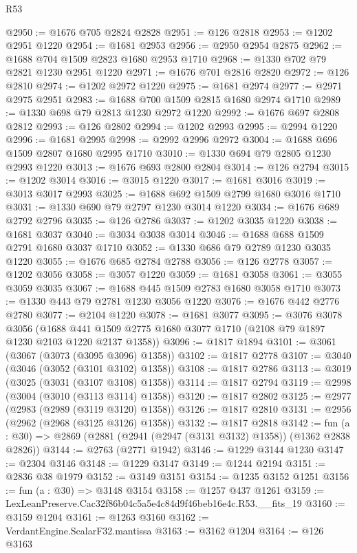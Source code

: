 \begin{lexlean}{R53}
\begin{coremodule}
@2950 := @1676 @705 @2824 @2828
@2951 := @126 @2818
@2953 := @1202 @2951 @1220
@2954 := @1681 @2953
@2956 := @2950 @2954 @2875
@2962 := @1688 @704 @1509 @2823 @1680 @2953 @1710
@2968 := @1330 @702 @79 @2821 @1230 @2951 @1220
@2971 := @1676 @701 @2816 @2820
@2972 := @126 @2810
@2974 := @1202 @2972 @1220
@2975 := @1681 @2974
@2977 := @2971 @2975 @2951
@2983 := @1688 @700 @1509 @2815 @1680 @2974 @1710
@2989 := @1330 @698 @79 @2813 @1230 @2972 @1220
@2992 := @1676 @697 @2808 @2812
@2993 := @126 @2802
@2994 := @1202 @2993
@2995 := @2994 @1220
@2996 := @1681 @2995
@2998 := @2992 @2996 @2972
@3004 := @1688 @696 @1509 @2807 @1680 @2995 @1710
@3010 := @1330 @694 @79 @2805 @1230 @2993 @1220
@3013 := @1676 @693 @2800 @2804
@3014 := @126 @2794
@3015 := @1202 @3014
@3016 := @3015 @1220
@3017 := @1681 @3016
@3019 := @3013 @3017 @2993
@3025 := @1688 @692 @1509 @2799 @1680 @3016 @1710
@3031 := @1330 @690 @79 @2797 @1230 @3014 @1220
@3034 := @1676 @689 @2792 @2796
@3035 := @126 @2786
@3037 := @1202 @3035 @1220
@3038 := @1681 @3037
@3040 := @3034 @3038 @3014
@3046 := @1688 @688 @1509 @2791 @1680 @3037 @1710
@3052 := @1330 @686 @79 @2789 @1230 @3035 @1220
@3055 := @1676 @685 @2784 @2788
@3056 := @126 @2778
@3057 := @1202 @3056
@3058 := @3057 @1220
@3059 := @1681 @3058
@3061 := @3055 @3059 @3035
@3067 := @1688 @445 @1509 @2783 @1680 @3058 @1710
@3073 := @1330 @443 @79 @2781 @1230 @3056 @1220
@3076 := @1676 @442 @2776 @2780
@3077 := @2104 @1220
@3078 := @1681 @3077
@3095 := @3076
    @3078
    @3056
    (@1688 @441 @1509 @2775 @1680 @3077 @1710 (@2108 @79 @1897 @1230 @2103 @1220 @2137 @1358))
@3096 := @1817 @1894
@3101 := @3061 (@3067 (@3073 (@3095 @3096) @1358))
@3102 := @1817 @2778
@3107 := @3040 (@3046 (@3052 (@3101 @3102) @1358))
@3108 := @1817 @2786
@3113 := @3019 (@3025 (@3031 (@3107 @3108) @1358))
@3114 := @1817 @2794
@3119 := @2998 (@3004 (@3010 (@3113 @3114) @1358))
@3120 := @1817 @2802
@3125 := @2977 (@2983 (@2989 (@3119 @3120) @1358))
@3126 := @1817 @2810
@3131 := @2956 (@2962 (@2968 (@3125 @3126) @1358))
@3132 := @1817 @2818
@3142 := fun (a : @30) => @2869 (@2881 (@2941 (@2947 (@3131 @3132) @1358)) (@1362 @2838 @2826))
@3144 := @2763 (@2771 @1942)
@3146 := @1229 @3144 @1230
@3147 := @2304 @3146
@3148 := @1229 @3147
@3149 := @1244 @2194
@3151 := @2836 @38 @1979
@3152 := @3149 @3151
@3154 := @1235 @3152 @1251
@3156 := fun (a : @30) => @3148 @3154
@3158 := @1257 @437 @1261
@3159 := LexLeanPreserve.Cac32f86b04c5a5e4c84d9f46beb16e4c.R53.__fits_19
@3160 := @3159 @1204
@3161 := @1263 @3160
@3162 := VerdantEngine.ScalarF32.mantissa
@3163 := @3162 @1204
@3164 := @126 @3163

\end{coremodule}
\end{lexlean}
